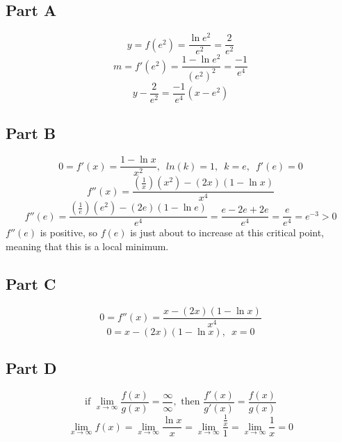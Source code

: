 \subsection{Part A}
\[ y = f(e^2) = \frac{\ln{e^2}}{e^2} = \frac{2}{e^2} \]
\[ m = f'(e^2) = \frac{1 - \ln{e^2}}{(e^2)^2} = \frac{-1}{e^4} \]
\[ y - \frac{2}{e^2} = \frac{-1}{e^4}(x - e^2) \]

\subsection{Part B}
\[ 0 = f'(x) = \frac{1 - \ln{x}}{x^2}, \enspace ln(k) = 1, \enspace k = e, \enspace f'(e) = 0 \]
\[ f''(x) = \frac{(\frac{1}{x})(x^2) - (2x)(1 - \ln{x})}{x^4} \] 
\[ f''(e) = \frac{(\frac{1}{e})(e^2) - (2e)(1 - \ln{e})}{e^4} = \frac{e - 2e + 2e}{e^4} = \frac{e}{e^4} = e^{-3} > 0 \]
$f''(e)$ is positive, so $f(e)$ is just about to increase at this critical point, meaning that this is a local minimum.

\subsection{Part C}
\[ 0 = f''(x) = \frac{x - (2x)(1 - \ln{x})}{x^4} \]
\[ 0 = x - (2x)(1 - \ln{x}), \enspace x = 0\]

\subsection{Part D}
\[ \text{if } \lim_{x \to \infty} \frac{f(x)}{g(x)} = \frac{\infty}{\infty}, \text{ then } \frac{f'(x)}{g'(x)} = \frac{f(x)}{g(x)} \]
\[ \lim_{x \to \infty} f(x) = \lim_{x \to \infty} \frac{\ln{x}}{x}  = \lim_{x \to \infty} \frac{\frac{1}{x}}{1} = \lim_{x \to \infty} \frac{1}{x} = 0 \]
